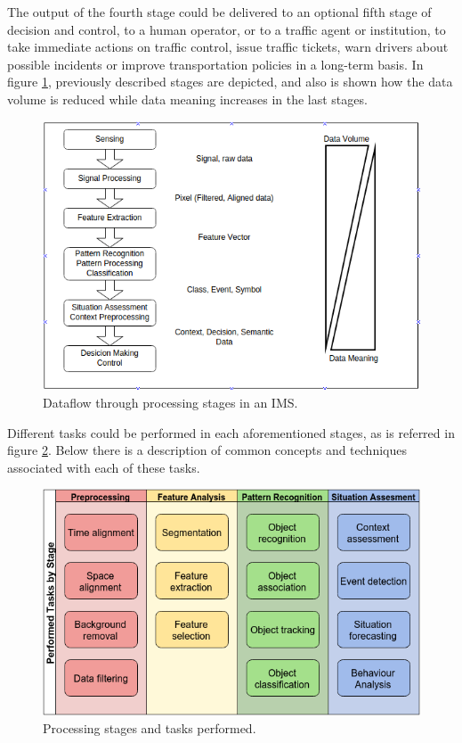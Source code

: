 \documentclass[10pt,twocolumn,letterpaper]{article}
\begin{document}
The output of the fourth stage could be delivered to an optional fifth stage of decision and control, to a human operator, or to a traffic agent or institution, to take immediate actions on traffic control, issue traffic tickets, warn drivers about possible incidents or improve transportation policies in a long-term basis. In figure \ref{proc_stages}, previously described stages are depicted, and also is shown how the data volume is reduced while data meaning increases in the last stages.

\begin{figure}[ht!]
\centering
\includegraphics[scale=0.35]{../fig/3/proc_stages.png}
\caption{Dataflow through processing stages in an IMS.}
\label{proc_stages}
\end{figure}

Different tasks could be performed in each aforementioned stages, as is referred in figure \ref{proc_stages_tasks}. Below there is a description of common concepts and techniques associated with each of these tasks.

\begin{figure}[ht!]
\centering
\includegraphics[scale=0.35]{../fig/3/processing_stages_and_tasks.png}
\caption{Processing stages and tasks performed.}
\label{proc_stages_tasks}
\end{figure}
\end{document}
